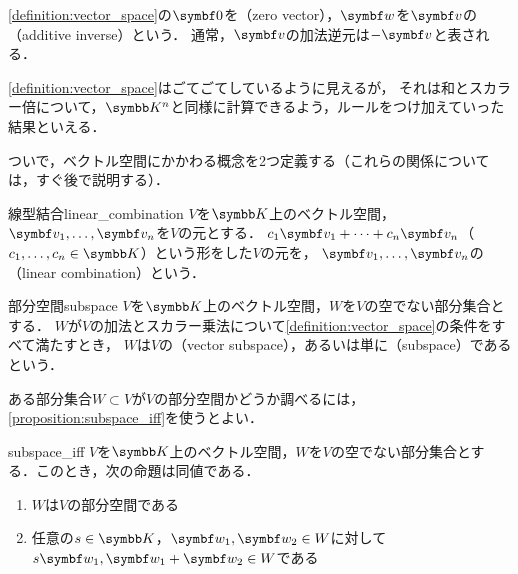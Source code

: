 \documentclass[../../main]{subfiles}
\begin{document}
\cref{definition:vector_space}の\(\zvec\)を（zero vector），\(\vect{w}\)を\(\vect{v}\)の（additive inverse）という．
通常，\(\vect{v}\)の加法逆元は\(-\vect{v}\)と表される．

\begin{note}
  \cref{definition:vector_space}はごてごてしているように見えるが，
  それは和とスカラー倍について，\(\numset{K}^n\)と同様に計算できるよう，ルールをつけ加えていった結果といえる．
\end{note}

ついで，ベクトル空間にかかわる概念を2つ定義する（これらの関係については，すぐ後で説明する）．

\begin{definition}{線型結合}{linear_combination}
\(V\)を\(\numset{K}\)上のベクトル空間，\(\vect{v}_1,\dots,\vect{v}_n\)を\(V\)の元とする．
\(c_1\vect{v}_1+\dots+c_n\vect{v}_n\)（\(c_1,\dots,c_n\in\numset{K}\)）という形をした\(V\)の元を，
\(\vect{v}_1,\dots,\vect{v}_n\)の（linear combination）という．
\end{definition}

\begin{definition}{部分空間}{subspace}
  \(V\)を\(\numset{K}\)上のベクトル空間，\(W\)を\(V\)の空でない部分集合とする．
  \(W\)が\(V\)の加法とスカラー乗法について\cref{definition:vector_space}の条件をすべて満たすとき，
  \(W\)は\(V\)の（vector subspace），あるいは単に（subspace）であるという．    
\end{definition}

ある部分集合\(W\subset V\)が\(V\)の部分空間かどうか調べるには，\cref{proposition:subspace_iff}を使うとよい．

\begin{proposition}{}{subspace_iff}
  \(V\)を\(\numset{K}\)上のベクトル空間，\(W\)を\(V\)の空でない部分集合とする．このとき，次の命題は同値である．
  \begin{enumerate}
    \item \(W\)は\(V\)の部分空間である
    \item 任意の\(s\in\numset{K}\)，\(\vect{w}_1,\vect{w}_2\in W\)に対して\(s\vect{w}_1,\vect{w}_1+\vect{w}_2\in W\)である
  \end{enumerate}
\end{proposition}
\end{document}
